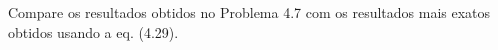 Compare os resultados obtidos no Problema 4.7 com os resultados mais exatos obtidos usando a eq. (4.29).

